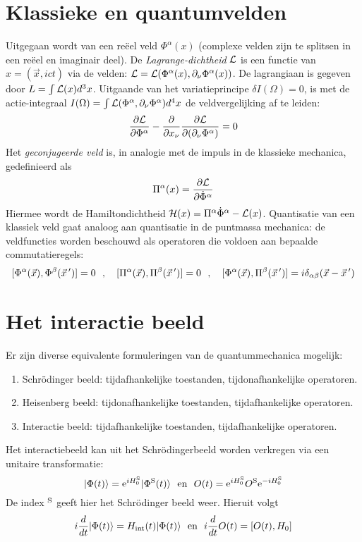 \section[~~Klassieke en quantumvelden]{Klassieke en quantumvelden}
Uitgegaan wordt van een re\"eel veld $\Phi^\alpha(x)$ (complexe velden zijn
te splitsen in een re\"eel en imaginair deel). De {\it Lagrange-dichtheid}
${\cal L}$ is een functie van $x=(\vec{x},ict)$ via de velden:
${\cal L}={\cal L}(\Phi^\alpha(x),\partial_\nu\Phi^\alpha(x))$. De lagrangiaan is
gegeven door $L=\int{\cal L}(x)d^3x$. Uitgaande van het variatieprincipe
$\delta I(\Omega)=0$, is met de actie-integraal
$I(\Omega)=\int{\cal L}(\Phi^\alpha,\partial_\nu\Phi^\alpha)d^4x$
de veldvergelijking af te leiden:
\[
\frac{\partial {\cal L}}{\partial \Phi^\alpha}-\frac{\partial }{\partial x_\nu}\frac{\partial {\cal L}}{\partial (\partial_\nu\Phi^\alpha)}=0
\]
Het {\it geconjugeerde veld} is, in analogie met de impuls in de klassieke
mechanica, gedefinieerd als
\[
\Pi^\alpha(x)=\frac{\partial {\cal L}}{\partial \dot{\Phi}^\alpha}
\]
Hiermee wordt de Hamiltondichtheid ${\cal H}(x)=\Pi^\alpha\dot{\Phi}^\alpha-{\cal L}(x)$.
\npar
Quantisatie van een klassiek veld gaat analoog aan quantisatie in de
puntmassa mechanica: de veldfuncties worden beschouwd als operatoren die
voldoen aan bepaalde commutatieregels:
\[
[\Phi^\alpha(\vec{x}),\Phi^\beta(\vec{x}\,')]=0~~,~~~
[\Pi^\alpha(\vec{x}),\Pi^\beta(\vec{x}\,')]=0~~,~~~
[\Phi^\alpha(\vec{x}),\Pi^\beta(\vec{x}\,')]=i\delta_{\alpha\beta}(\vec{x}-\vec{x}\,')
\]

\section[~~Het interactie beeld]{Het interactie beeld}
Er zijn diverse equivalente formuleringen van de quantummechanica mogelijk:
\begin{enumerate}
\item Schr\"odinger beeld: tijdafhankelijke toestanden, tijdonafhankelijke operatoren.
\item Heisenberg beeld: tijdonafhankelijke toestanden, tijdafhankelijke operatoren.
\item Interactie beeld: tijdafhankelijke toestanden, tijdafhankelijke operatoren.
\end{enumerate}
Het interactiebeeld kan uit het Schr\"odingerbeeld worden verkregen via een
unitaire transformatie:
\[
|\Phi(t)\rangle={\rm e}^{iH_0^{\rm S}}|\Phi^{\rm S}(t)\rangle~~\mbox{en}~~
O(t)={\rm e}^{iH_0^{\rm S}}O^{\rm S}{\rm e}^{-iH_0^{\rm S}}
\]
De index $^{\rm S}$ geeft hier het Schr\"odinger beeld weer. Hieruit volgt
\[
i\frac{d}{dt}|\Phi(t)\rangle=H_{\rm int}(t)|\Phi(t)\rangle~~\mbox{en}~~
i\frac{d}{dt}O(t)=[O(t),H_0]
\]


